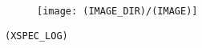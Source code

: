 \documentclass[10pt,a4paper]{article}
\begin{document}
\begin{figure}[H]
    \texttt{[image: (IMAGE\_DIR)/(IMAGE)]}
    \label{fig:(LABEL)}
\end{figure}

{\scriptsize
\begin{verbatim}
(XSPEC_LOG)
\end{verbatim}}
\end{document}
